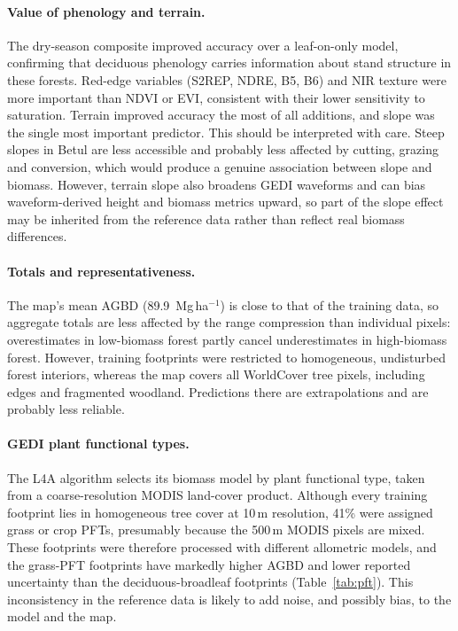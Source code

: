 \documentclass[11pt,a4paper]{article}
\newcommand{\mgha}{Mg\,ha$^{-1}$}
\begin{document}
\paragraph{Value of phenology and terrain.} The dry-season composite improved accuracy over a
leaf-on-only model, confirming that deciduous phenology carries information about stand
structure in these forests. Red-edge variables (S2REP, NDRE, B5, B6) and NIR texture were more
important than NDVI or EVI, consistent with their lower sensitivity to saturation. Terrain
improved accuracy the most of all additions, and slope was the single most important
predictor. This should be interpreted with care. Steep slopes in Betul are less accessible and
probably less affected by cutting, grazing and conversion, which would produce a genuine
association between slope and biomass. However, terrain slope also broadens GEDI waveforms and
can bias waveform-derived height and biomass metrics upward, so part of the slope effect may be
inherited from the reference data rather than reflect real biomass differences.

\paragraph{Totals and representativeness.} The map's mean AGBD (89.9~\mgha{}) is close to that of
the training data, so aggregate totals are less affected by the range compression than
individual pixels: overestimates in low-biomass forest partly cancel underestimates in
high-biomass forest. However, training footprints were restricted to homogeneous, undisturbed
forest interiors, whereas the map covers all WorldCover tree pixels, including edges and
fragmented woodland. Predictions there are extrapolations and are probably less reliable.

\paragraph{GEDI plant functional types.} The L4A algorithm selects its biomass model by plant
functional type, taken from a coarse-resolution MODIS land-cover product. Although every
training footprint lies in homogeneous tree cover at 10\,m resolution, 41\% were assigned grass
or crop PFTs, presumably because the 500\,m MODIS pixels are mixed. These footprints were
therefore processed with different allometric models, and the grass-PFT footprints have
markedly higher AGBD and lower reported uncertainty than the deciduous-broadleaf footprints
(Table~\ref{tab:pft}). This inconsistency in the reference data is likely to add noise, and
possibly bias, to the model and the map.
\end{document}
